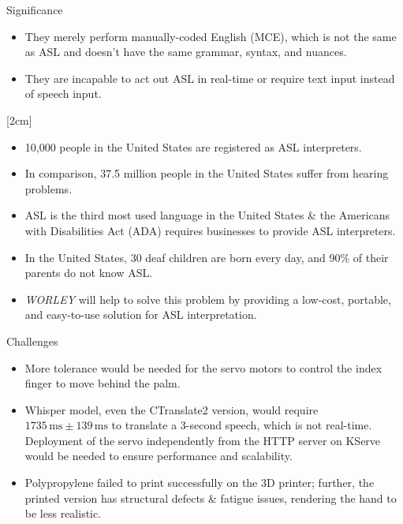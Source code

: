 \documentclass[final, 20pt]{beamer}
\newlength{\colwidth}
\begin{document}
\begin{frame}[t]
\begin{columns}[t]
\begin{column}{\colwidth}
\begin{block}{Significance}
        \begin{itemize}
          \item They merely perform manually-coded English (MCE), which is not the same as ASL and doesn't have the same grammar, syntax, and nuances.
          \item They are incapable to act out ASL in real-time or require text input instead of speech input.
        \end{itemize}

        [2cm]

        \begin{itemize}
          \item 10,000 people in the United States are registered as ASL interpreters.
          \item In comparison, 37.5 million people in the United States suffer from hearing problems.
          \item ASL is the third most used language in the United States \& the Americans with Disabilities Act (ADA) requires businesses to provide ASL interpreters.
          \item In the United States, 30 deaf children are born every day, and 90\% of their parents do not know ASL.
          \item \emph{WORLEY} will help to solve this problem by providing a low-cost, portable, and easy-to-use solution for ASL interpretation.
        \end{itemize}
      \end{block}

      \begin{block}{Challenges}
        \begin{itemize}
          \item More tolerance would be needed for the servo motors to control the index finger to move behind the palm.
          \item Whisper model, even the CTranslate2 version, would require $1735\,\text{ms}\pm 139\,\text{ms}$ to translate a 3-second speech, which is not real-time. Deployment of the servo independently from the HTTP server on KServe would be needed to ensure performance and scalability.
          \item Polypropylene failed to print successfully on the 3D printer; further, the printed version has structural defects \& fatigue issues, rendering the hand to be less realistic.
        \end{itemize}
      \end{block}


\end{column}
\end{columns}
\end{frame}
\end{document}
